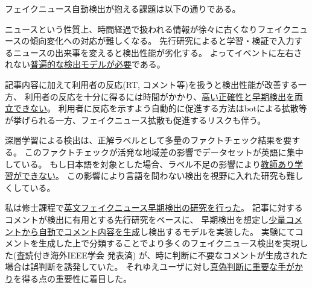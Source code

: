 フェイクニュース自動検出が抱える課題は以下の通りである。
\vspace{-3mm}
\begin{description}
    \setlength{\parskip}{0cm}
    \setlength{\itemsep}{0cm}
    \item[ニュースのタイムリー性] %
        ニュースという性質上、時間経過で扱われる情報が徐々に古くなりフェイクニュースの傾向変化への対応が難しくなる。
        先行研究によると学習・検証で入力するニュースの出来事を変えると検出性能が劣化する\cite{Wang:2018:EEA:3219819.3219903}。
        よってイベントに左右されない\underline{普遍的な検出モデルが必要}である。
    \item[早期検出と正確性の両立] %
        記事内容に加えて利用者の反応(RT, コメント等)を扱うと検出性能が改善する\cite{Wu:2018:TFF:3159652.3159677}一方、
        利用者の反応を十分に得るには時間がかかり、\underline{高い正確性と早期検出を両立できない}。
        利用者に反応を示すよう自動的に促進する方法はbotによる拡散等が挙げられる一方、フェイクニュース拡散も促進するリスクも伴う。
    \item[日本語データセット不足] %
        深層学習による検出は、正解ラベルとして多量のファクトチェック結果を要する。
        このファクトチェックが活発な地域差の影響でデータセットが英語に集中\cite{fakenewsnet}している。
        もし日本語を対象とした場合、ラベル不足の影響により\underline{教師あり学習ができない}。
        この影響により言語を問わない検出を視野に入れた研究も難しくしている。
    \end{description}

私は修士課程で\underline{英文フェイクニュース早期検出の研究を行った}。
記事に対するコメントが検出に有用とする先行研究\cite{defend}をベースに、
早期検出を想定し\underline{少量コメントから自動でコメント内容を生成}し検出するモデルを実装した。
実験にてコメントを生成した上で分類することでより多くのフェイクニュース検出を実現した(査読付き海外IEEE学会 発表済\cite{ines})
が、時に判断に不要なコメントが生成された場合は誤判断を誘発していた。
それゆえユーザに対し\underline{真偽判断に重要な手がかり}を得る点の重要性に着目した。

